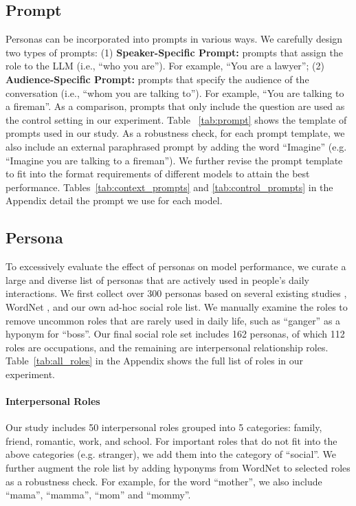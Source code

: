 \documentclass[11pt]{article}
\newcommand{\tref}[1]{Table~\ref{#1}}
\begin{document}
\subsection{Prompt}
Personas can be incorporated into prompts in various ways. We carefully design two types of prompts: (1) \textbf{Speaker-Specific Prompt:} prompts that assign the role to the LLM (i.e., ``who you are''). For example, ``You are a lawyer''; (2) \textbf{Audience-Specific Prompt:} prompts that specify the audience of the conversation (i.e., ``whom you are talking to''). For example, ``You are talking to a fireman''. As a comparison, prompts that only include the question are used as the control setting in our experiment. Table ~\ref{tab:prompt} shows the template of prompts used in our study. As a robustness check, for each prompt template, we also include an external paraphrased prompt by adding the word ``Imagine'' (e.g. ``Imagine you are talking to a fireman''). We further revise the prompt template to fit into the format requirements of different models to attain the best performance. Tables~\ref{tab:context_prompts} and \ref{tab:control_prompts} in the Appendix detail the prompt we use for each model.

\subsection{Persona}
To excessively evaluate the effect of personas on model performance, we curate a large and diverse list of personas that are actively used in people's daily interactions.  We first collect over 300 personas based on several existing studies \citep{garg2018word, massey2015annotating, choi2021more}, WordNet \citep{miller1995wordnet}, and our own ad-hoc social role list. We manually examine the roles to remove uncommon roles that are rarely used in daily life, such as ``ganger'' as a hyponym for ``boss''. Our final social role set includes 162 personas, of which 112 roles are occupations, and the remaining are interpersonal relationship roles. \tref{tab:all_roles} in the Appendix shows the full list of roles in our experiment.

\paragraph{Interpersonal Roles}
Our study includes 50 interpersonal roles grouped into 5 categories: family, friend, romantic, work, and school. For important roles that do not fit into the above categories (e.g. stranger), we add them into the category of ``social''. 
We further augment the role list by adding hyponyms from WordNet \citep{miller1995wordnet} to selected roles as a robustness check. %
For example, for the word ``mother'', we also include ``mama'', ``mamma'', ``mom'' and ``mommy''. 
\end{document}
